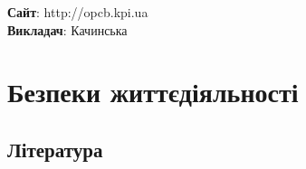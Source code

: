 \documentclass[a4paper,12pt,ukrainian]{book}
\begin{document}
\tableofcontents
\textbf{Сайт}: http://opcb.kpi.ua \\
\textbf{Викладач}: Качинська 
\chapter{Безпеки життєдіяльності}



\section{Література}
\end{document}
